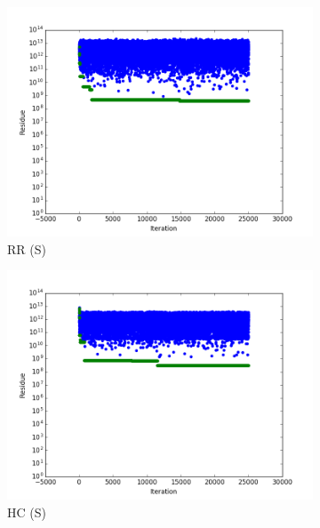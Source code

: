\documentclass[12pt]{article}
\begin{document}
\begin{figure}[h]
\begin{center}
\begin{subfigure}[t]{0.3\textwidth}
\includegraphics[width=\textwidth]{img/rrs.png}
\caption{RR (S)}
\end{subfigure}
\begin{subfigure}[t]{0.3\textwidth}
\includegraphics[width=\textwidth]{img/hcs.png}
\caption{HC (S)}
\end{subfigure}
\begin{subfigure}[t]{0.3\textwidth}

\end{subfigure}
\end{center}
\end{figure}
\end{document}
